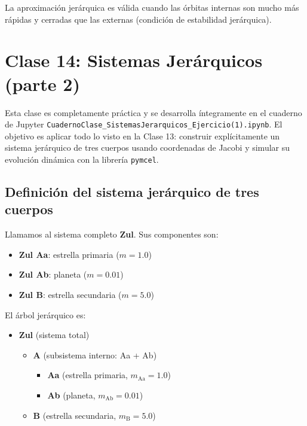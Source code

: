 \documentclass[12pt,oneside]{book}
\begin{document}
\begin{importante}
La aproximación jerárquica es válida cuando las órbitas internas son mucho más rápidas y cerradas que las externas (condición de estabilidad jerárquica).
\end{importante}


\chapter{Clase 14: Sistemas Jerárquicos (parte 2)}

Esta clase es completamente práctica y se desarrolla íntegramente en el cuaderno de Jupyter \texttt{CuadernoClase\_SistemasJerarquicos\_Ejercicio(1).ipynb}. El objetivo es aplicar todo lo visto en la Clase 13: construir explícitamente un sistema jerárquico de tres cuerpos usando coordenadas de Jacobi y simular su evolución dinámica con la librería \texttt{pymcel}.

\section{Definición del sistema jerárquico de tres cuerpos}
Llamamos al sistema completo \textbf{Zul}. Sus componentes son:
\begin{itemize}
    \item \textbf{Zul Aa}: estrella primaria (\(m = 1.0\))
    \item \textbf{Zul Ab}: planeta (\(m = 0.01\))
    \item \textbf{Zul B}: estrella secundaria (\(m = 5.0\))
\end{itemize}

El árbol jerárquico es:

\begin{itemize}[leftmargin=2em,label={}]
\item \textbf{Zul} (sistema total)
  \begin{itemize}[leftmargin=2em,label={}]
  \item \textbf{A} (subsistema interno: Aa + Ab)
    \begin{itemize}[leftmargin=2em,label={}]
    \item \textbf{Aa} (estrella primaria, \(m_{\text{Aa}} = 1.0\))
    \item \textbf{Ab} (planeta, \(m_{\text{Ab}} = 0.01\))
    \end{itemize}
  \item \textbf{B} (estrella secundaria, \(m_{\text{B}} = 5.0\))
  \end{itemize}
\end{itemize}
\end{document}
